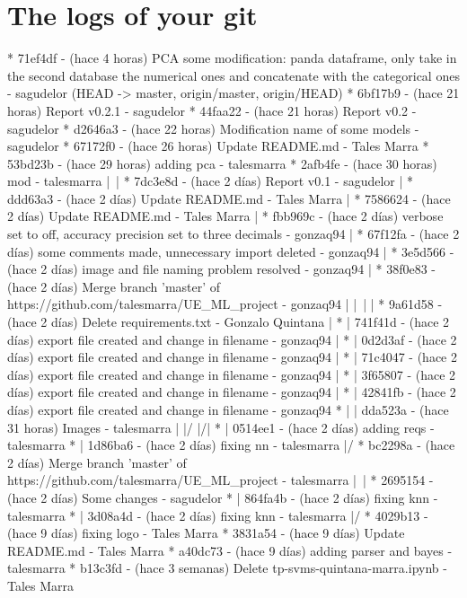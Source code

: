 \documentclass[11pt,a4paper]{article}
\begin{document}
\section{The logs of your git}
\begin{verbatimprog}

* 71ef4df - (hace 4 horas) PCA some modification: panda dataframe, only take in
                the second database the numerical ones and concatenate with the categorical
    ones - sagudelor (HEAD -> master, origin/master, origin/HEAD)
* 6bf17b9 - (hace 21 horas) Report v0.2.1 - sagudelor
* 44faa22 - (hace 21 horas) Report v0.2 - sagudelor
* d2646a3 - (hace 22 horas) Modification name of some models - sagudelor
* 67172f0 - (hace 26 horas) Update README.md - Tales Marra
* 53bd23b - (hace 29 horas) adding pca - talesmarra
*   2afb4fe - (hace 30 horas) mod - talesmarra
|\  
| * 7dc3e8d - (hace 2 días) Report v0.1 - sagudelor
| * ddd63a3 - (hace 2 días) Update README.md - Tales Marra
| * 7586624 - (hace 2 días) Update README.md - Tales Marra
| * fbb969c - (hace 2 días) verbose set to off, accuracy precision set to three decimals - gonzaq94
| * 67f12fa - (hace 2 días) some comments made, unnecessary import deleted - gonzaq94
| * 3e5d566 - (hace 2 días) image and file naming problem resolved - gonzaq94
| *   38f0e83 - (hace 2 días) Merge branch 'master' of https://github.com/talesmarra/UE_ML_project - gonzaq94
| |\  
| | * 9a61d58 - (hace 2 días) Delete requirements.txt - Gonzalo Quintana
| * | 741f41d - (hace 2 días) export file created and change in filename - gonzaq94
| * | 0d2d3af - (hace 2 días) export file created and change in filename - gonzaq94
| * | 71c4047 - (hace 2 días) export file created and change in filename - gonzaq94
| * | 3f65807 - (hace 2 días) export file created and change in filename - gonzaq94
| * | 42841fb - (hace 2 días) export file created and change in filename - gonzaq94
* | | dda523a - (hace 31 horas) Images - talesmarra
| |/  
|/|   
* | 0514ee1 - (hace 2 días) adding reqs - talesmarra
* | 1d86ba6 - (hace 2 días) fixing nn - talesmarra
|/  
*   bc2298a - (hace 2 días) Merge branch 'master' of https://github.com/talesmarra/UE_ML_project - talesmarra
|\  
| * 2695154 - (hace 2 días) Some changes - sagudelor
* | 864fa4b - (hace 2 días) fixing knn - talesmarra
* | 3d08a4d - (hace 2 días) fixing knn - talesmarra
|/  
* 4029b13 - (hace 9 días) fixing logo - Tales Marra
* 3831a54 - (hace 9 días) Update README.md - Tales Marra
* a40dc73 - (hace 9 días) adding parser and bayes - talesmarra
* b13c3fd - (hace 3 semanas) Delete tp-svms-quintana-marra.ipynb - Tales Marra

\end{verbatimprog}
\end{document}
